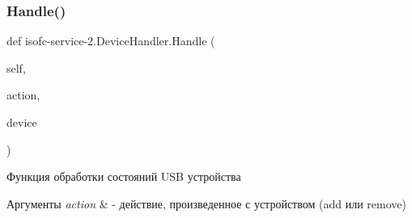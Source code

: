 \subsubsection{\texorpdfstring{Handle()}{Handle()}}
{\footnotesize\ttfamily def isofc-\/service-\/2.Device\+Handler.\+Handle (\begin{DoxyParamCaption}\item[{}]{self,  }\item[{}]{action,  }\item[{}]{device }\end{DoxyParamCaption})}



Функция обработки состояний U\+SB устройства 


\begin{DoxyParams}{Аргументы}
{\em action} & -\/ действие, произведенное с устройством (add или remove) \\
\hline
\end{DoxyParams}

